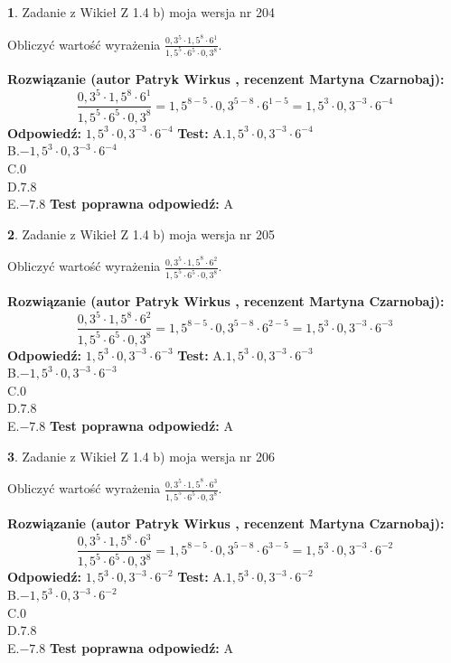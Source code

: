 \documentclass[12pt, a4paper]{article}
\theoremstyle{definition} %
\newtheorem{zad}{}
\newcommand{\zadStart}[1]{\begin{zad}#1\newline}
\newcommand{\zadStop}{\end{zad}}
\newcommand{\rozwStart}[2]{\noindent \textbf{Rozwiązanie (autor #1 , recenzent #2): }\newline}
\newcommand{\rozwStop}{\newline}
\newcommand{\odpStart}{\noindent \textbf{Odpowiedź:}\newline}
\newcommand{\odpStop}{\newline}
\newcommand{\testStart}{\noindent \textbf{Test:}\newline}
\newcommand{\testStop}{\newline}
\newcommand{\kluczStart}{\noindent \textbf{Test poprawna odpowiedź:}\newline}
\newcommand{\kluczStop}{\newline}
\begin{document}
\zadStart{Zadanie z Wikieł Z 1.4 b) moja wersja nr 204}

Obliczyć wartość wyrażenia $\frac{0,3^{5}\cdot1,5^{8}\cdot6^{1}}{1,5^{5}\cdot6^{5}\cdot0,3^{8}}$.
\zadStop
\rozwStart{Patryk Wirkus}{Martyna Czarnobaj}
$$\frac{0,3^{5}\cdot1,5^{8}\cdot6^{1}}{1,5^{5}\cdot6^{5}\cdot0,3^{8}} = 1,5^{8-5} \cdot 0,3^{5-8} \cdot 6^{1-5} = 1,5^{3} \cdot 0,3^{-3} \cdot 6^{-4}$$
\rozwStop
\odpStart
$1,5^{3} \cdot 0,3^{-3} \cdot 6^{-4}$
\odpStop
\testStart
A.$1,5^{3} \cdot 0,3^{-3} \cdot 6^{-4}$\\ B.$-1,5^{3} \cdot 0,3^{-3} \cdot 6^{-4}$\\ C.$0$\\ D.$7.8$\\ E.$-7.8$
\testStop
\kluczStart
A
\kluczStop



\zadStart{Zadanie z Wikieł Z 1.4 b) moja wersja nr 205}

Obliczyć wartość wyrażenia $\frac{0,3^{5}\cdot1,5^{8}\cdot6^{2}}{1,5^{5}\cdot6^{5}\cdot0,3^{8}}$.
\zadStop
\rozwStart{Patryk Wirkus}{Martyna Czarnobaj}
$$\frac{0,3^{5}\cdot1,5^{8}\cdot6^{2}}{1,5^{5}\cdot6^{5}\cdot0,3^{8}} = 1,5^{8-5} \cdot 0,3^{5-8} \cdot 6^{2-5} = 1,5^{3} \cdot 0,3^{-3} \cdot 6^{-3}$$
\rozwStop
\odpStart
$1,5^{3} \cdot 0,3^{-3} \cdot 6^{-3}$
\odpStop
\testStart
A.$1,5^{3} \cdot 0,3^{-3} \cdot 6^{-3}$\\ B.$-1,5^{3} \cdot 0,3^{-3} \cdot 6^{-3}$\\ C.$0$\\ D.$7.8$\\ E.$-7.8$
\testStop
\kluczStart
A
\kluczStop



\zadStart{Zadanie z Wikieł Z 1.4 b) moja wersja nr 206}

Obliczyć wartość wyrażenia $\frac{0,3^{5}\cdot1,5^{8}\cdot6^{3}}{1,5^{5}\cdot6^{5}\cdot0,3^{8}}$.
\zadStop
\rozwStart{Patryk Wirkus}{Martyna Czarnobaj}
$$\frac{0,3^{5}\cdot1,5^{8}\cdot6^{3}}{1,5^{5}\cdot6^{5}\cdot0,3^{8}} = 1,5^{8-5} \cdot 0,3^{5-8} \cdot 6^{3-5} = 1,5^{3} \cdot 0,3^{-3} \cdot 6^{-2}$$
\rozwStop
\odpStart
$1,5^{3} \cdot 0,3^{-3} \cdot 6^{-2}$
\odpStop
\testStart
A.$1,5^{3} \cdot 0,3^{-3} \cdot 6^{-2}$\\ B.$-1,5^{3} \cdot 0,3^{-3} \cdot 6^{-2}$\\ C.$0$\\ D.$7.8$\\ E.$-7.8$
\testStop
\kluczStart
A
\kluczStop
\end{document}
